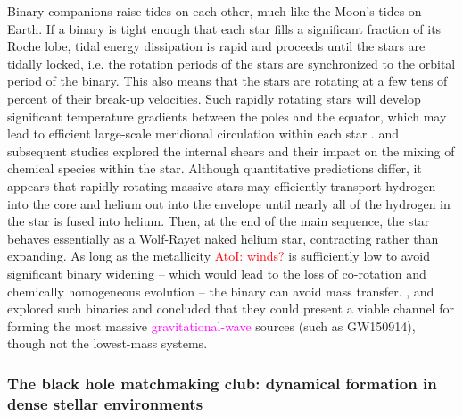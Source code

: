 \documentclass[iop,onecolumn]{revtex4}
\newcommand{\ajf}[1]{\textcolor{red}{AtoI: #1}}
\newcommand{\ilya}[1]{\textcolor{magenta}{#1}}
\begin{document}
Binary companions raise tides on each other, much like the Moon's tides on Earth.  If a binary is tight enough that each star fills a significant fraction of its Roche lobe, tidal energy dissipation is rapid and proceeds until the stars are tidally locked, i.e. the rotation periods of the stars are synchronized to the orbital period of the binary. This also means that the stars are rotating at a few tens of percent of their break-up velocities.  Such rapidly rotating stars will develop significant temperature gradients between the poles and the equator, which may lead to efficient large-scale meridional circulation within each star \citep{Eddington:1925,Sweet:1950}.  \citet{EndalSofia:1978} and subsequent studies \citep[e.g.,][]{Heger:2000,MaederMeynet:2000,Yoon:2006} explored the internal shears and their impact on the mixing of chemical species within the star.  Although quantitative predictions differ, it appears that rapidly rotating massive stars may efficiently transport hydrogen into the core and helium out into the envelope until nearly all of the hydrogen in the star is fused into helium.  Then, at the end of the main sequence, the star behaves essentially as a Wolf-Rayet naked helium star, contracting rather than expanding. As long as the metallicity \ajf{winds?} is sufficiently low to avoid significant binary widening -- which would lead to the loss of co-rotation and chemically homogeneous evolution \citep{deMink:2009} -- the binary can avoid mass transfer.  \citet{MandeldeMink:2016,deMinkMandel:2016}, and \citet{Marchant:2016} explored such binaries and concluded that they could present a viable channel for forming the most massive \ilya{gravitational-wave} sources (such as GW150914), though not the lowest-mass systems.

\subsubsection{The black hole matchmaking club: dynamical formation in dense stellar environments}
\end{document}
